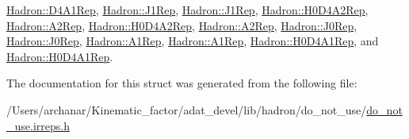 \mbox{\hyperlink{structHadron_1_1D4A1Rep_a935e95f3ad80b6499e276424e3573730}{Hadron\+::\+D4\+A1\+Rep}}, \mbox{\hyperlink{structHadron_1_1J1Rep_af725f8ff10c84cda5410728ce30697da}{Hadron\+::\+J1\+Rep}}, \mbox{\hyperlink{structHadron_1_1J1Rep_af725f8ff10c84cda5410728ce30697da}{Hadron\+::\+J1\+Rep}}, \mbox{\hyperlink{structHadron_1_1H0D4A2Rep_ad23c66fe369200d0ff8bebcabf8dfc62}{Hadron\+::\+H0\+D4\+A2\+Rep}}, \mbox{\hyperlink{structHadron_1_1A2Rep_a31e1135ddb204394f1c6153797a7dffa}{Hadron\+::\+A2\+Rep}}, \mbox{\hyperlink{structHadron_1_1H0D4A2Rep_ad23c66fe369200d0ff8bebcabf8dfc62}{Hadron\+::\+H0\+D4\+A2\+Rep}}, \mbox{\hyperlink{structHadron_1_1A2Rep_a31e1135ddb204394f1c6153797a7dffa}{Hadron\+::\+A2\+Rep}}, \mbox{\hyperlink{structHadron_1_1J0Rep_a357214188122dd0e69716a4f7ff098b1}{Hadron\+::\+J0\+Rep}}, \mbox{\hyperlink{structHadron_1_1J0Rep_a357214188122dd0e69716a4f7ff098b1}{Hadron\+::\+J0\+Rep}}, \mbox{\hyperlink{structHadron_1_1A1Rep_a6b592d902063cfea9bd1cedcdeb9ac79}{Hadron\+::\+A1\+Rep}}, \mbox{\hyperlink{structHadron_1_1A1Rep_a6b592d902063cfea9bd1cedcdeb9ac79}{Hadron\+::\+A1\+Rep}}, \mbox{\hyperlink{structHadron_1_1H0D4A1Rep_afbedc9857e7215106a2225ff351ada68}{Hadron\+::\+H0\+D4\+A1\+Rep}}, and \mbox{\hyperlink{structHadron_1_1H0D4A1Rep_afbedc9857e7215106a2225ff351ada68}{Hadron\+::\+H0\+D4\+A1\+Rep}}.



The documentation for this struct was generated from the following file\+:\begin{DoxyCompactItemize}
\item 
/\+Users/archanar/\+Kinematic\+\_\+factor/adat\+\_\+devel/lib/hadron/do\+\_\+not\+\_\+use/\mbox{\hyperlink{do__not__use_8irreps_8h}{do\+\_\+not\+\_\+use.\+irreps.\+h}}\end{DoxyCompactItemize}
